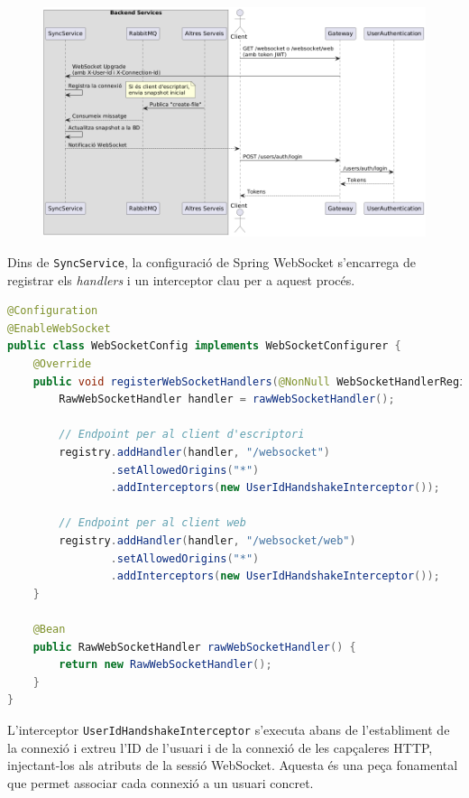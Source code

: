 \begin{figure}[H]
    \centering
    \includegraphics[width=\textwidth]{Figures/flux/connect_websocket.png}
\end{figure}

Dins de \texttt{SyncService}, la configuració de Spring WebSocket s'encarrega de registrar els \textit{handlers} i un interceptor clau per a aquest procés.

\begin{lstlisting}[language=Java, caption={Configuració del WebSocket a `SyncService`}]
@Configuration
@EnableWebSocket
public class WebSocketConfig implements WebSocketConfigurer {
    @Override
    public void registerWebSocketHandlers(@NonNull WebSocketHandlerRegistry registry) {
        RawWebSocketHandler handler = rawWebSocketHandler();
        
        // Endpoint per al client d'escriptori
        registry.addHandler(handler, "/websocket")
                .setAllowedOrigins("*")
                .addInterceptors(new UserIdHandshakeInterceptor());
                
        // Endpoint per al client web
        registry.addHandler(handler, "/websocket/web")
                .setAllowedOrigins("*")
                .addInterceptors(new UserIdHandshakeInterceptor());
    }
    
    @Bean
    public RawWebSocketHandler rawWebSocketHandler() {
        return new RawWebSocketHandler();
    }
}
\end{lstlisting}

L'interceptor \texttt{UserIdHandshakeInterceptor} s'executa abans de l'establiment de la connexió i extreu l'ID de l'usuari i de la connexió de les capçaleres HTTP, injectant-los als atributs de la sessió WebSocket. Aquesta és una peça fonamental que permet associar cada connexió a un usuari concret.

